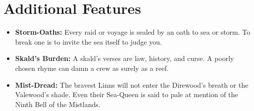 \section*{Additional Features}
\begin{itemize}
\item \textbf{Storm-Oaths:} Every raid or voyage is sealed by an oath to sea or storm. To break one is to invite the sea itself to judge you.
\item \textbf{Skald’s Burden:} A skald’s verses are law, history, and curse. A poorly chosen rhyme can damn a crew as surely as a reef.
\item \textbf{Mist-Dread:} The bravest Linns will not enter the Direwood’s breath or the Valewood’s shade. Even their Sea-Queen is said to pale at mention of the Ninth Bell of the Mistlands.
\end{itemize}

